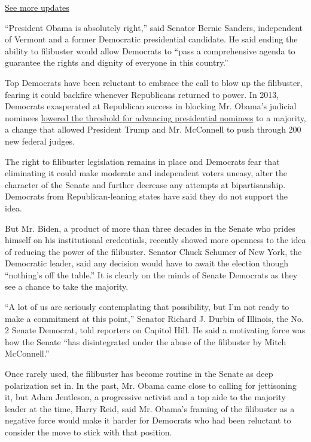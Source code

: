 \href{https://www.nytimes.com/2020/07/31/us/elections/biden-vs-trump.html?action=click\&pgtype=Article\&state=default\&region=MAIN_CONTENT_1\&context=storylines_live_updates}{See
more updates}

``President Obama is absolutely right,'' said Senator Bernie Sanders,
independent of Vermont and a former Democratic presidential candidate.
He said ending the ability to filibuster would allow Democrats to ``pass
a comprehensive agenda to guarantee the rights and dignity of everyone
in this country.''

Top Democrats have been reluctant to embrace the call to blow up the
filibuster, fearing it could backfire whenever Republicans returned to
power. In 2013, Democrats exasperated at Republican success in blocking
Mr. Obama's judicial nominees
\href{https://www.nytimes.com/2013/11/22/us/politics/reid-sets-in-motion-steps-to-limit-use-of-filibuster.html}{lowered
the threshold for advancing presidential nominees} to a majority, a
change that allowed President Trump and Mr. McConnell to push through
200 new federal judges.

The right to filibuster legislation remains in place and Democrats fear
that eliminating it could make moderate and independent voters uneasy,
alter the character of the Senate and further decrease any attempts at
bipartisanship. Democrats from Republican-leaning states have said they
do not support the idea.

But Mr. Biden, a product of more than three decades in the Senate who
prides himself on his institutional credentials, recently showed more
openness to the idea of reducing the power of the filibuster. Senator
Chuck Schumer of New York, the Democratic leader, said any decision
would have to await the election though ``nothing's off the table.'' It
is clearly on the minds of Senate Democrats as they see a chance to take
the majority.

``A lot of us are seriously contemplating that possibility, but I'm not
ready to make a commitment at this point,'' Senator Richard J. Durbin of
Illinois, the No. 2 Senate Democrat, told reporters on Capitol Hill. He
said a motivating force was how the Senate ``has disintegrated under the
abuse of the filibuster by Mitch McConnell.''

Once rarely used, the filibuster has become routine in the Senate as
deep polarization set in. In the past, Mr. Obama came close to calling
for jettisoning it, but Adam Jentleson, a progressive activist and a top
aide to the majority leader at the time, Harry Reid, said Mr. Obama's
framing of the filibuster as a negative force would make it harder for
Democrats who had been reluctant to consider the move to stick with that
position.

